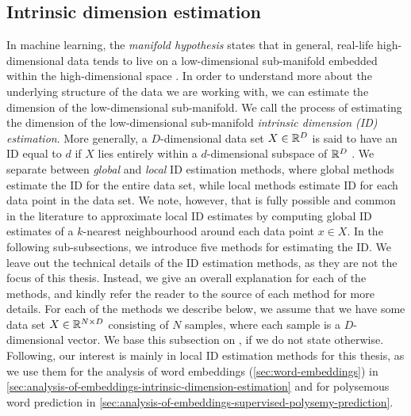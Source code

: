 \subsection{Intrinsic dimension estimation}
\label{sec:intrinsic-dimension-estimation}
In machine learning, the \textit{manifold hypothesis} states that in general, real-life high-dimensional data tends to live on a low-dimensional sub-manifold embedded within the high-dimensional space \cite[p. 16]{bengio2014representation}. In order to understand more about the underlying structure of the data we are working with, we can estimate the dimension of the low-dimensional sub-manifold. We call the process of estimating the dimension of the low-dimensional sub-manifold \textit{intrinsic dimension (ID) estimation}. More generally, a $D$-dimensional data set $X \in \mathbb{R}^D$ is said to have an ID equal to $d$ if $X$ lies entirely within a $d$-dimensional subspace of $\mathbb{R}^D$ \cite{lee2015intrinsic}. We separate between \textit{global} and \textit{local} ID estimation methods, where global methods estimate the ID for the entire data set, while local methods estimate ID for each data point in the data set. We note, however, that is fully possible and common in the literature to approximate local ID estimates by computing global ID estimates of a $k$-nearest neighbourhood around each data point $x \in X$. In the following sub-subsections, we introduce five methods for estimating the ID. We leave out the technical details of the ID estimation methods, as they are not the focus of this thesis. Instead, we give an overall explanation for each of the methods, and kindly refer the reader to the source of each method for more details. For each of the methods we describe below, we assume that we have some data set $X \in \mathbb{R}^{N \times D}$ consisting of $N$ samples, where each sample is a $D$-dimensional vector. We base this subsection on \cite{lee2015intrinsic}, if we do not state otherwise. Following, our interest is mainly in local ID estimation methods for this thesis, as we use them for the analysis of word embeddings (\cref{sec:word-embeddings}) in \cref{sec:analysis-of-embeddings-intrinsic-dimension-estimation} and for polysemous word prediction in \cref{sec:analysis-of-embeddings-supervised-polysemy-prediction}.

